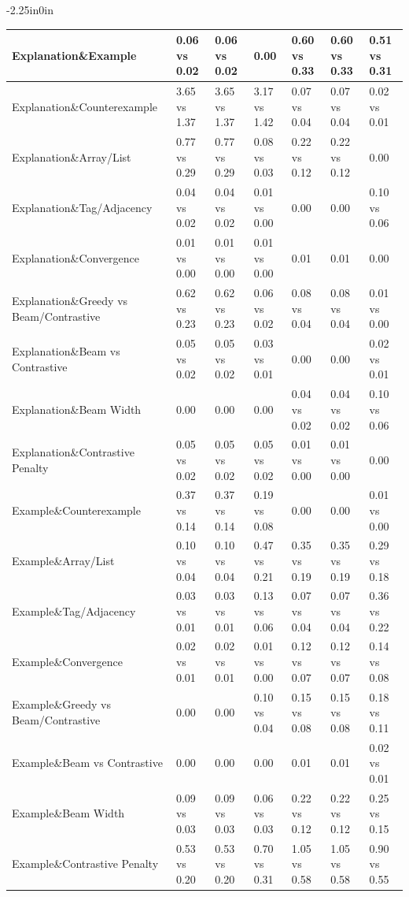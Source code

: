 \begin{table}[h]
\begin{adjustwidth}{-2.25in}{0in}
{\begin{tabular}{|l|lll|lll|}
Explanation\&Example & 0.06 vs 0.02 & 0.06 vs 0.02 & 0.00 & 0.60 vs 0.33 & 0.60 vs 0.33 & 0.51 vs 0.31 \\
\hline
Explanation\&Counterexample & 3.65 vs 1.37 & 3.65 vs 1.37 & 3.17 vs 1.42 & 0.07 vs 0.04 & 0.07 vs 0.04 & 0.02 vs 0.01 \\
\hline
Explanation\&Array/List & 0.77 vs 0.29 & 0.77 vs 0.29 & 0.08 vs 0.03 & 0.22 vs 0.12 & 0.22 vs 0.12 & 0.00 \\
\hline
Explanation\&Tag/Adjacency & 0.04 vs 0.02 & 0.04 vs 0.02 & 0.01 vs 0.00 & 0.00 & 0.00 & 0.10 vs 0.06 \\
\hline
Explanation\&Convergence & 0.01 vs 0.00 & 0.01 vs 0.00 & 0.01 vs 0.00 & 0.01 & 0.01 & 0.00 \\
\hline
Explanation\&Greedy vs Beam/Contrastive & 0.62 vs 0.23 & 0.62 vs 0.23 & 0.06 vs 0.02 & 0.08 vs 0.04 & 0.08 vs 0.04 & 0.01 vs 0.00 \\
\hline
Explanation\&Beam vs Contrastive & 0.05 vs 0.02 & 0.05 vs 0.02 & 0.03 vs 0.01 & 0.00 & 0.00 & 0.02 vs 0.01 \\
\hline
Explanation\&Beam Width & 0.00 & 0.00 & 0.00 & 0.04 vs 0.02 & 0.04 vs 0.02 & 0.10 vs 0.06 \\
\hline
Explanation\&Contrastive Penalty & 0.05 vs 0.02 & 0.05 vs 0.02 & 0.05 vs 0.02 & 0.01 vs 0.00 & 0.01 vs 0.00 & 0.00 \\
\hline
Example\&Counterexample & 0.37 vs 0.14 & 0.37 vs 0.14 & 0.19 vs 0.08 & 0.00 & 0.00 & 0.01 vs 0.00 \\
\hline
Example\&Array/List & 0.10 vs 0.04 & 0.10 vs 0.04 & 0.47 vs 0.21 & 0.35 vs 0.19 & 0.35 vs 0.19 & 0.29 vs 0.18 \\
\hline
Example\&Tag/Adjacency & 0.03 vs 0.01 & 0.03 vs 0.01 & 0.13 vs 0.06 & 0.07 vs 0.04 & 0.07 vs 0.04 & 0.36 vs 0.22 \\
\hline
Example\&Convergence & 0.02 vs 0.01 & 0.02 vs 0.01 & 0.01 vs 0.00 & 0.12 vs 0.07 & 0.12 vs 0.07 & 0.14 vs 0.08 \\
\hline
Example\&Greedy vs Beam/Contrastive & 0.00 & 0.00 & 0.10 vs 0.04 & 0.15 vs 0.08 & 0.15 vs 0.08 & 0.18 vs 0.11 \\
\hline
Example\&Beam vs Contrastive & 0.00 & 0.00 & 0.00 & 0.01 & 0.01 & 0.02 vs 0.01 \\
\hline
Example\&Beam Width & 0.09 vs 0.03 & 0.09 vs 0.03 & 0.06 vs 0.03 & 0.22 vs 0.12 & 0.22 vs 0.12 & 0.25 vs 0.15 \\
\hline
Example\&Contrastive Penalty & 0.53 vs 0.20 & 0.53 vs 0.20 & 0.70 vs 0.31 & 1.05 vs 0.58 & 1.05 vs 0.58 & 0.90 vs 0.55 \\

\end{tabular}}
\end{adjustwidth}
\end{table}

